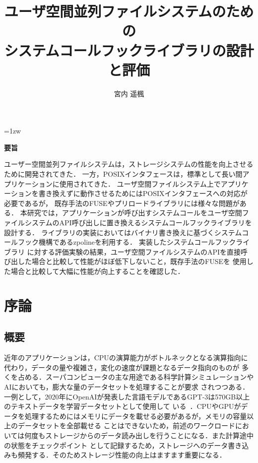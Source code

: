 \documentclass[a4paper,11pt]{jreport}
\title{ユーザ空間並列ファイルシステムのための\\システムコールフックライブラリの設計と評価}
\author{宮内 遥楓}
\begin{document}
\maketitle
\thispagestyle{empty}
\newpage

\thispagestyle{empty}
\vspace*{20pt plus 1fil}
\parindent=1zw
\noindent
\begin{center}
{\Large \bf 要旨}
\vspace{2cm}
\end{center}
ユーザー空間並列ファイルシステムは，ストレージシステムの性能を向上させるために開発されてきた． 
一方，POSIXインタフェースは，標準として長い間アプリケーションに使用されてきた．
ユーザ空間ファイルシステム上でアプリケーションを書き換えずに動作させるためにはPOSIXインタフェースへの対応が必要であるが，
既存手法のFUSEやプリロードライブラリには様々な問題がある．
本研究では，アプリケーションが呼び出すシステムコールをユーザ空間ファイルシステムのAPI呼び出しに置き換えるシステムコールフックライブラリを設計する．
ライブラリの実装においてはバイナリ書き換えに基づくシステムコールフック機構であるzpolineを利用する． 実装したシステムコールフックライブラリ
に対する評価実験の結果，ユーザ空間ファイルシステムのAPIを直接呼び出した場合と比較して性能がほぼ低下しないこと，既存手法のFUSEを
使用した場合と比較して大幅に性能が向上することを確認した．

\par
\vspace{0pt plus 1fil}
\newpage

\tableofcontents
\listoffigures
\lstlistoflistings

\pagebreak \setcounter{page}{1}

\chapter{序論}
\section{概要}
近年のアプリケーションは，CPUの演算能力がボトルネックとなる演算指向に代わり，データの量や複雑さ，変化の速度が課題となるデータ指向のものが
多くを占める．スーパコンピュータの主な用途である科学計算シミュレーションやAIにおいても，膨大な量のデータセットを処理することが要求
されつつある．一例として，2020年にOpenAIが発表した言語モデルであるGPT-3は570GB以上のテキストデータを学習データセットとして使用して
いる~\cite{3495883}．CPUやGPUがデータを処理するためにはメモリにデータを載せる必要があるが，メモリの容量以上のデータセットを全部載せる
ことはできないため，前述のワークロードにおいては何度もストレージからのデータ読み出しを行うことになる．また計算途中の状態をチェックポイント
として記録するため，ストレージへのデータ書き込みも頻発する．そのためストレージ性能の向上はますます重要になる．
\end{document}
